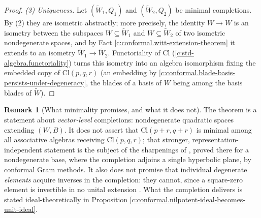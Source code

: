 \documentclass[11pt]{article}
\theoremstyle{definition}
\newtheorem{remark}[theorem]{Remark}
\theoremstyle{plain}
\providecommand{\Cl}{}\renewcommand{\Cl}{\mathrm{Cl}}
\begin{document}
\begin{proof}
\emph{(3) Uniqueness.} Let $(\widetilde W_1, Q_1)$ and $(\widetilde W_2, Q_2)$ be minimal completions. By (2) they are isometric abstractly; more precisely, the identity $W \to W$ is an isometry between the subspaces $W \subseteq \widetilde W_1$ and $W \subseteq \widetilde W_2$ of two isometric nondegenerate spaces, and by Fact \ref{c:conformal.witt-extension-theorem} it extends to an isometry $\widetilde W_1 \to \widetilde W_2$. Functoriality of $\Cl$ (\ref{c:std-algebra.functoriality}) turns this isometry into an algebra isomorphism fixing the embedded copy of $\Cl(p,q,r)$ (an embedding by \ref{c:conformal.blade-basis-persists-under-degeneracy}, the blades of a basis of $W$ being among the basis blades of $\widetilde W$).

\end{proof}

\begin{remark}[What minimality promises, and what it does not]\label{c:note.conformal.what-minimality-promises-what-it-does}
The theorem is a statement about \emph{vector-level} completions: nondegenerate quadratic spaces extending $(W,B)$. It does not assert that $\Cl(p{+}r,q{+}r)$ is minimal among all associative algebras receiving $\Cl(p,q,r)$; that stronger, representation-independent statement is the subject of the sharpenings of \cite[\S4.6]{ButlerT1}, proved there for a nondegenerate base, where the completion adjoins a single hyperbolic plane, by conformal Gram methods. It also does not promise that individual degenerate \emph{elements} acquire inverses in the completion: they cannot, since a square-zero element is invertible in no unital extension \cite[Lem.~2.1]{ButlerT1}. What the completion delivers is stated ideal-theoretically in Proposition \ref{c:conformal.nilpotent-ideal-becomes-unit-ideal}.
\end{remark}
\end{document}
